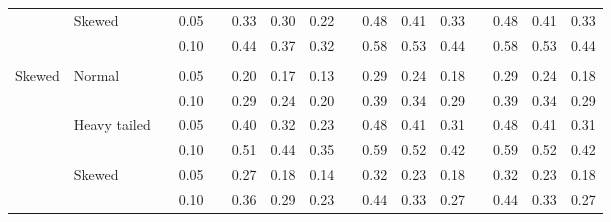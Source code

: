 \documentclass{article} %
\begin{document}
\begin{table}[ht]
\begin{scriptsize}
\begin{center}
\begin{tabular}{ll p{.1cm} c p{.1cm} rrr p{.1cm} rrr p{.1cm} rrr}
             & Skewed       && 0.05 &&  0.33 & 0.30 & 0.22 && 0.48 & 0.41 & 0.33 && 0.48 & 0.41 & 0.33 \\ 
             &              && 0.10 &&  0.44 & 0.37 & 0.32 && 0.58 & 0.53 & 0.44 && 0.58 & 0.53 & 0.44 \\ 
             &&&&&&&&&&&&&&&\\
Skewed       & Normal       && 0.05 &&  0.20 & 0.17 & 0.13 && 0.29 & 0.24 & 0.18 && 0.29 & 0.24 & 0.18 \\ 
             &              && 0.10 &&  0.29 & 0.24 & 0.20 && 0.39 & 0.34 & 0.29 && 0.39 & 0.34 & 0.29 \\ 
             & Heavy tailed && 0.05 &&  0.40 & 0.32 & 0.23 && 0.48 & 0.41 & 0.31 && 0.48 & 0.41 & 0.31 \\ 
             &              && 0.10 &&  0.51 & 0.44 & 0.35 && 0.59 & 0.52 & 0.42 && 0.59 & 0.52 & 0.42 \\ 
             & Skewed       && 0.05 &&  0.27 & 0.18 & 0.14 && 0.32 & 0.23 & 0.18 && 0.32 & 0.23 & 0.18 \\ 
             &              && 0.10 &&  0.36 & 0.29 & 0.23 && 0.44 & 0.33 & 0.27 && 0.44 & 0.33 & 0.27 \\ 



\end{tabular}
\end{center}
\end{scriptsize}
\end{table}
\end{document}
